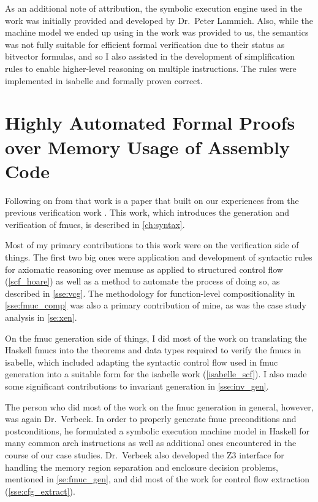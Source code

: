 As an additional note of attribution, the symbolic execution engine
used in the work was initially provided and developed by Dr.~Peter Lammich.
Also, while the machine model we ended up using in the work was provided to us,
the semantics was not fully suitable for efficient formal verification
due to their status as bitvector formulas,
and so I also assisted in the development of simplification rules
to enable higher-level reasoning on multiple instructions.
The rules were implemented in \gls{isabelle} and formally proven correct.

\section*{Highly Automated Formal Proofs over Memory Usage of Assembly Code}
\label{attribute2}
Following on from that work is a paper
that built on our experiences from the previous verification
work \autocite{verbeek2020automated}. This work,
which introduces the generation and verification of
\acp{fmuc}, is described in \cref{ch:syntax}.

Most of my primary contributions to this work were on the verification side of things.
The first two big ones were application and development of syntactic rules
for axiomatic reasoning over \gls{memuse}
as applied to structured control flow (\cref{scf_hoare})
as well as a method to automate the process of doing so, 
as described in \cref{sse:vcg}.
The methodology for function-level compositionality in \cref{sse:fmuc_comp}
was also a primary contribution of mine,
as was the case study analysis in \cref{se:xen}.

On the \ac{fmuc} generation side of things,
I did most of the work on translating the Haskell \acp{fmuc}
into the theorems and data types required to verify the \acp{fmuc} in \gls{isabelle},
which included adapting the syntactic control flow used in \ac{fmuc} generation
into a suitable form for the \gls{isabelle} work (\cref{isabelle_scf}).
I also made some significant contributions to invariant generation in \cref{sse:inv_gen}.

The person who did most of the work on the \ac{fmuc} generation in general,
however, was again Dr.~Verbeek.
In order to properly generate \ac{fmuc} preconditions and postconditions,
he formulated a symbolic execution machine model in Haskell
for many common \gls{arch} instructions
as well as additional ones encountered in the course of our case studies.
Dr.~Verbeek also developed the Z3 interface
for handling the memory region separation and enclosure decision problems,
mentioned in \cref{se:fmuc_gen},
and did most of the work for control flow extraction (\cref{sse:cfg_extract}).

